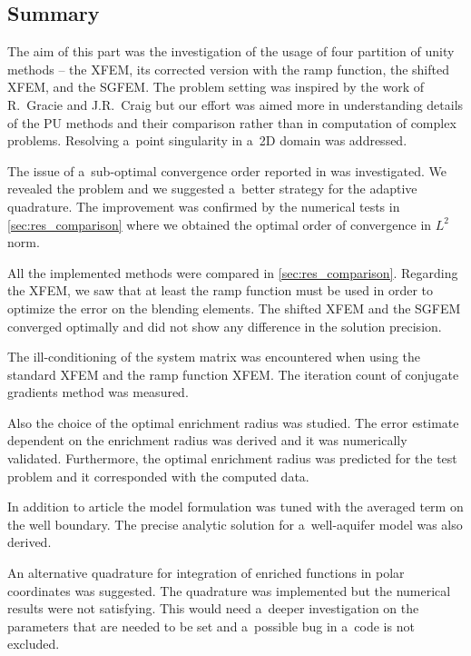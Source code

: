\subsection{Summary}
\label{sec:summary}

The aim of this part was the investigation of the usage of four partition of unity methods -- the XFEM, its corrected version with the ramp 
function, the shifted XFEM, and the SGFEM. The problem setting was inspired by the work \cite{gracie_modelling_2010,craig_using_2011} 
of R.~Gracie and J.R.~Craig but our effort was aimed more in understanding details of the PU methods and their comparison
rather than in computation of complex problems. Resolving a~point singularity in a~2D domain was addressed.

The issue of a~sub-optimal convergence order reported in \cite{gracie_modelling_2010} was investigated. 
We revealed the problem and we suggested a~better strategy for the adaptive quadrature. 
The improvement was confirmed by the numerical tests in \ref{sec:res_comparison} where we obtained the optimal 
order of convergence in $L^2$ norm.

All the implemented methods were compared in \ref{sec:res_comparison}. Regarding the XFEM, we saw that at 
least the ramp function must be used in order to optimize the error on the blending elements. 
The shifted XFEM and the SGFEM converged optimally and did not show any difference in the solution precision.

The ill-conditioning of the system matrix was encountered when using the standard XFEM and the ramp function XFEM.
The iteration count of conjugate gradients method was measured.

Also the choice of the optimal enrichment radius was studied. The error estimate dependent on the enrichment
radius was derived and it was numerically validated. Furthermore, the optimal enrichment radius was predicted 
for the test problem and it corresponded with the computed data.

In addition to article \cite{exner_2016} the model formulation was tuned with the averaged term on the well
boundary. The precise analytic solution for a~well-aquifer model was also derived.

An alternative quadrature for integration of enriched functions in polar coordinates was suggested.
The quadrature was implemented but the numerical results were not satisfying. This would need a~deeper 
investigation on the parameters that are needed to be set and a~possible bug in a~code is not excluded.

